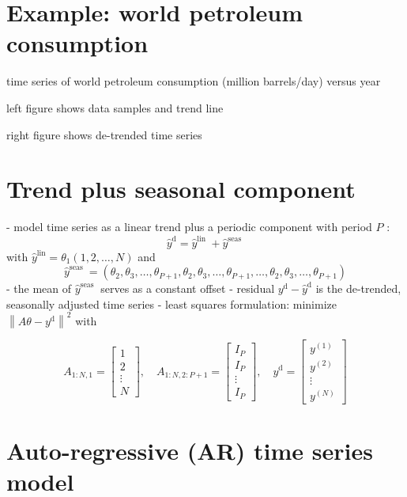 \section{Example: world petroleum consumption}


time series of world petroleum consumption (million barrels/day) versus year

left figure shows data samples and trend line

right figure shows de-trended time series

\section{Trend plus seasonal component}


- model time series as a linear trend plus a periodic component with period $ P $ :
$$
\hat{y}^{\mathrm{d}}=\hat{y}^{\text {lin }}+\hat{y}^{\text {seas }}
$$
with $ \hat{y}^{\operatorname{lin}}=\theta_{1}(1,2, \ldots, N) $ and
$$
\hat{y}^{\text {seas }}=\left(\theta_{2}, \theta_{3}, \ldots, \theta_{P+1}, \theta_{2}, \theta_{3}, \ldots, \theta_{P+1}, \ldots, \theta_{2}, \theta_{3}, \ldots, \theta_{P+1}\right)
$$
- the mean of $ \hat{y}^{\text {seas }} $ serves as a constant offset
- residual $ y^{\mathrm{d}}-\hat{y}^{\mathrm{d}} $ is the de-trended, seasonally adjusted time series
- least squares formulation: minimize $ \left\|A \theta-y^{\mathrm{d}}\right\|^{2} $ with

$$ A_{1: N, 1}=\left[\begin{array}{c}1 \\ 2 \\ \vdots \\ N\end{array}\right], \quad A_{1: N, 2: P+1}=\left[\begin{array}{c}I_{P} \\ I_{P} \\ \vdots \\ I_{P}\end{array}\right], \quad y^{\mathrm{d}}=\left[\begin{array}{c}y^{(1)} \\ y^{(2)} \\ \vdots \\ y^{(N)}\end{array}\right] $$

\section{Auto-regressive (AR) time series model}

